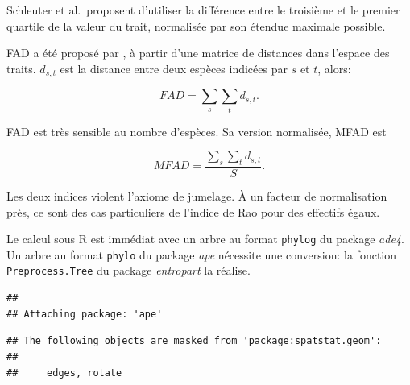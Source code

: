 \documentclass[
  11pt,
  french,
  a4paper,
  extrafontsizes,onecolumn,openright
  ]{memoir}
\newenvironment{Shaded}{\begin{snugshade}}{\end{snugshade}}
\newcommand{\CommentTok}[1]{\textcolor[rgb]{0.56,0.35,0.01}{\textit{#1}}}
\newcommand{\DecValTok}[1]{\textcolor[rgb]{0.00,0.00,0.81}{#1}}
\newcommand{\FunctionTok}[1]{\textcolor[rgb]{0.13,0.29,0.53}{\textbf{#1}}}
\newcommand{\NormalTok}[1]{#1}
\newcommand{\OtherTok}[1]{\textcolor[rgb]{0.56,0.35,0.01}{#1}}
\newcommand{\SpecialCharTok}[1]{\textcolor[rgb]{0.81,0.36,0.00}{\textbf{#1}}}
\newcommand{\StringTok}[1]{\textcolor[rgb]{0.31,0.60,0.02}{#1}}
\begin{document}
Schleuter et al.~proposent d'utiliser la différence entre le troisième et le premier quartile de la valeur du trait, normalisée par son étendue maximale possible.

FAD a été proposé par \textcite{Walker1999}, à partir d'une matrice de distances dans l'espace des traits.
\(d_{s,t}\) est la distance entre deux espèces indicées par \(s\) et \(t\), alors:

\begin{equation}
  \label{eq:FAD}
  \mathit{FAD}=\sum_s{\sum_t{d_{s,t}}}.
\end{equation}

FAD est très sensible au nombre d'espèces.
Sa version normalisée, MFAD \autocite{Schmera2009} est

\begin{equation}
  \label{eq:MFAD}
  \mathit{MFAD}=\frac{\sum_s{\sum_t{d_{s,t}}}}{S}.
\end{equation}

Les deux indices violent l'axiome de jumelage.
À un facteur de normalisation près, ce sont des cas particuliers de l'indice de Rao pour des effectifs égaux.

Le calcul sous R est immédiat avec un arbre au format \texttt{phylog} du package \emph{ade4}.
Un arbre au format \texttt{phylo} du package \emph{ape} nécessite une conversion: la fonction \texttt{Preprocess.Tree} du package \emph{entropart} la réalise.

\scriptsize

\begin{Shaded}
\end{Shaded}

\begin{verbatim}
## 
## Attaching package: 'ape'
\end{verbatim}

\begin{verbatim}
## The following objects are masked from 'package:spatstat.geom':
## 
##     edges, rotate
\end{verbatim}
\end{document}
